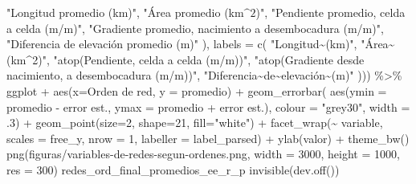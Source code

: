 \documentclass[spanish]{article}
\newenvironment{Shaded}{\begin{snugshade}}{\end{snugshade}}
\newcommand{\AttributeTok}[1]{\textcolor[rgb]{0.77,0.63,0.00}{#1}}
\newcommand{\DecValTok}[1]{\textcolor[rgb]{0.00,0.00,0.81}{#1}}
\newcommand{\FunctionTok}[1]{\textcolor[rgb]{0.00,0.00,0.00}{#1}}
\newcommand{\NormalTok}[1]{#1}
\newcommand{\SpecialCharTok}[1]{\textcolor[rgb]{0.00,0.00,0.00}{#1}}
\newcommand{\StringTok}[1]{\textcolor[rgb]{0.31,0.60,0.02}{#1}}
\begin{document}
\begin{Shaded}
\begin{Highlighting}[]
      \StringTok{"Longitud promedio (km)"}\NormalTok{,}
      \StringTok{"Área promedio (km$\^{}2$)"}\NormalTok{,}
      \StringTok{"Pendiente promedio, celda a celda (m/m)"}\NormalTok{,}
      \StringTok{"Gradiente promedio, nacimiento a desembocadura (m/m)"}\NormalTok{,}
      \StringTok{"Diferencia de elevación promedio (m)"}
\NormalTok{    ),}
    \AttributeTok{labels =} \FunctionTok{c}\NormalTok{(}
      \StringTok{"Longitud\textasciitilde{}(km)"}\NormalTok{,}
      \StringTok{"Área\textasciitilde{}(km\^{}2)"}\NormalTok{,}
      \StringTok{"atop(\textquotesingle{}Pendiente\textquotesingle{}, \textquotesingle{}celda a celda (m/m)\textquotesingle{})"}\NormalTok{,}
      \StringTok{"atop(\textquotesingle{}Gradiente desde nacimiento\textquotesingle{}, \textquotesingle{}a desembocadura (m/m)\textquotesingle{})"}\NormalTok{,}
      \StringTok{"Diferencia\textasciitilde{}de\textasciitilde{}elevación\textasciitilde{}(m)"}
\NormalTok{    ))) }\SpecialCharTok{\%\textgreater{}\%} 
\NormalTok{  ggplot }\SpecialCharTok{+} \FunctionTok{aes}\NormalTok{(}\AttributeTok{x=}\StringTok{\textasciigrave{}}\AttributeTok{Orden de red}\StringTok{\textasciigrave{}}\NormalTok{, }\AttributeTok{y =}\NormalTok{ promedio) }\SpecialCharTok{+}
  \FunctionTok{geom\_errorbar}\NormalTok{(}
    \FunctionTok{aes}\NormalTok{(}\AttributeTok{ymin =}\NormalTok{ promedio }\SpecialCharTok{{-}} \StringTok{\textasciigrave{}}\AttributeTok{error est.}\StringTok{\textasciigrave{}}\NormalTok{, }\AttributeTok{ymax =}\NormalTok{ promedio }\SpecialCharTok{+} \StringTok{\textasciigrave{}}\AttributeTok{error est.}\StringTok{\textasciigrave{}}\NormalTok{),}
    \AttributeTok{colour =} \StringTok{"grey30"}\NormalTok{, }\AttributeTok{width =}\NormalTok{ .}\DecValTok{3}\NormalTok{) }\SpecialCharTok{+}
  \FunctionTok{geom\_point}\NormalTok{(}\AttributeTok{size=}\DecValTok{2}\NormalTok{, }\AttributeTok{shape=}\DecValTok{21}\NormalTok{, }\AttributeTok{fill=}\StringTok{"white"}\NormalTok{) }\SpecialCharTok{+} 
  \FunctionTok{facet\_wrap}\NormalTok{(}\SpecialCharTok{\textasciitilde{}}\NormalTok{ variable, }\AttributeTok{scales =} \StringTok{\textquotesingle{}free\_y\textquotesingle{}}\NormalTok{, }\AttributeTok{nrow =} \DecValTok{1}\NormalTok{,}
             \AttributeTok{labeller =}\NormalTok{ label\_parsed) }\SpecialCharTok{+}
  \FunctionTok{ylab}\NormalTok{(}\StringTok{\textquotesingle{}valor\textquotesingle{}}\NormalTok{) }\SpecialCharTok{+}
  \FunctionTok{theme\_bw}\NormalTok{()}
\FunctionTok{png}\NormalTok{(}\StringTok{\textquotesingle{}figuras/variables{-}de{-}redes{-}segun{-}ordenes.png\textquotesingle{}}\NormalTok{, }\AttributeTok{width =} \DecValTok{3000}\NormalTok{, }\AttributeTok{height =} \DecValTok{1000}\NormalTok{, }\AttributeTok{res =} \DecValTok{300}\NormalTok{)}
\NormalTok{redes\_ord\_final\_promedios\_ee\_r\_p}
\FunctionTok{invisible}\NormalTok{(}\FunctionTok{dev.off}\NormalTok{())}
\end{Highlighting}
\end{Shaded}
\end{document}
